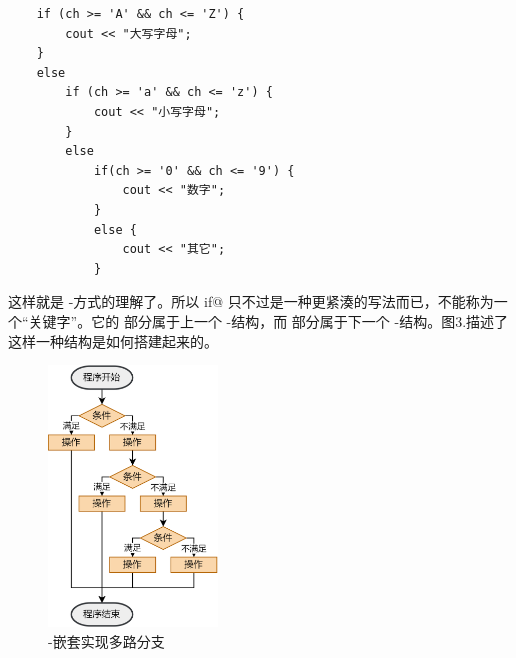 \begin{lstlisting}
    if (ch >= 'A' && ch <= 'Z') {
        cout << "大写字母";
    }
    else
        if (ch >= 'a' && ch <= 'z') {
            cout << "小写字母";
        }
        else
            if(ch >= '0' && ch <= '9') {
                cout << "数字";
            }
            else {
                cout << "其它";
            }
\end{lstlisting}
这样就是 \lstinline@if@-\lstinline@else@ 方式的理解了。所以 \lstinline@else if@ 只不过是一种更紧湊的写法而已，不能称为一个``关键字''。它的 \lstinline@else@ 部分属于上一个 \lstinline@if@-\lstinline@else@ 结构，而 \lstinline@if@ 部分属于下一个 \lstinline@if@-\lstinline@else@ 结构。图3.描述了这样一种结构是如何搭建起来的。\par
\begin{figure}[htbp]
    \centering
    \includegraphics[width=0.4\textwidth]{../images/generalized_parts/03_if_elseif_else_300.png}
    \caption{\lstinline@if@-\lstinline@else@ 嵌套实现多路分支}
\end{figure}
